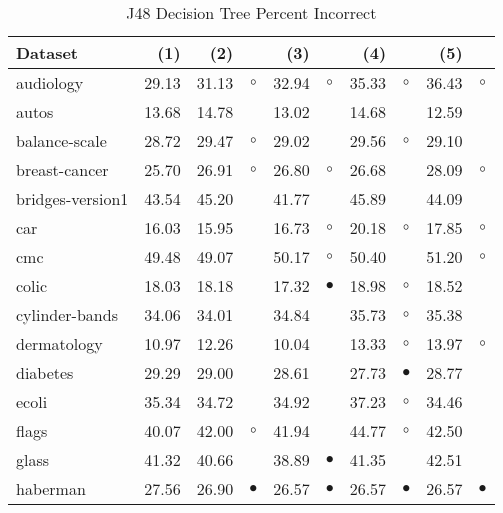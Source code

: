 \newpage
{\centering \footnotesize \begin{longtable}{lrr@{\hspace{0.1cm}}cr@{\hspace{0.1cm}}cr@{\hspace{0.1cm}}cr@{\hspace{0.1cm}}c}
\caption{\label{j48pi}J48 Decision Tree Percent Incorrect}
\\
\hline
Dataset & (1)& (2) & & (3) & & (4) & & (5) & \\
\hline
audiology & 29.13 & 31.13 &   $\circ$ & 32.94 &   $\circ$ & 35.33 &   $\circ$ & 36.43 &   $\circ$\\
autos & 13.68 & 14.78 &           & 13.02 &           & 14.68 &           & 12.59 &          \\
balance-scale & 28.72 & 29.47 &   $\circ$ & 29.02 &           & 29.56 &   $\circ$ & 29.10 &          \\
breast-cancer & 25.70 & 26.91 &   $\circ$ & 26.80 &   $\circ$ & 26.68 &           & 28.09 &   $\circ$\\
bridges-version1 & 43.54 & 45.20 &           & 41.77 &           & 45.89 &           & 44.09 &          \\
car & 16.03 & 15.95 &           & 16.73 &   $\circ$ & 20.18 &   $\circ$ & 17.85 &   $\circ$\\
cmc & 49.48 & 49.07 &           & 50.17 &   $\circ$ & 50.40 &           & 51.20 &   $\circ$\\
colic & 18.03 & 18.18 &           & 17.32 & $\bullet$ & 18.98 &   $\circ$ & 18.52 &          \\
cylinder-bands & 34.06 & 34.01 &           & 34.84 &           & 35.73 &   $\circ$ & 35.38 &          \\
dermatology & 10.97 & 12.26 &           & 10.04 &           & 13.33 &   $\circ$ & 13.97 &   $\circ$\\
diabetes & 29.29 & 29.00 &           & 28.61 &           & 27.73 & $\bullet$ & 28.77 &          \\
ecoli & 35.34 & 34.72 &           & 34.92 &           & 37.23 &   $\circ$ & 34.46 &          \\
flags & 40.07 & 42.00 &   $\circ$ & 41.94 &           & 44.77 &   $\circ$ & 42.50 &          \\
glass & 41.32 & 40.66 &           & 38.89 & $\bullet$ & 41.35 &           & 42.51 &          \\
haberman & 27.56 & 26.90 & $\bullet$ & 26.57 & $\bullet$ & 26.57 & $\bullet$ & 26.57 & $\bullet$\\

\end{longtable}}
